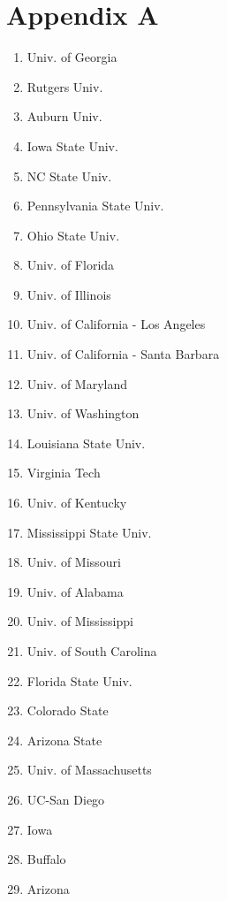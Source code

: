 \documentclass[12pt]{article}
\begin{document}
    \section{Appendix A}
    \begin{enumerate}
    	\item Univ. of Georgia
    	\item Rutgers Univ.
    	\item Auburn Univ.
    	\item Iowa State Univ.
    	\item NC State Univ.
    	\item Pennsylvania State Univ.
    	\item Ohio State Univ.
    	\item Univ. of Florida
    	\item Univ. of Illinois
    	\item Univ. of California - Los Angeles
    	\item Univ. of California - Santa Barbara
    	\item Univ. of Maryland
    	\item Univ. of Washington
    	\item Louisiana State Univ.
    	\item Virginia Tech
    	\item Univ. of Kentucky
    	\item Mississippi State Univ.
    	\item Univ. of Missouri
    	\item Univ. of Alabama
    	\item Univ. of Mississippi
    	\item Univ. of South Carolina
    	\item Florida State Univ.
    	\item Colorado State
    	\item Arizona State
    	\item Univ. of Massachusetts
    	\item UC-San Diego
    	\item Iowa
    	\item Buffalo
    	\item Arizona
    \end{enumerate}
\end{document}
